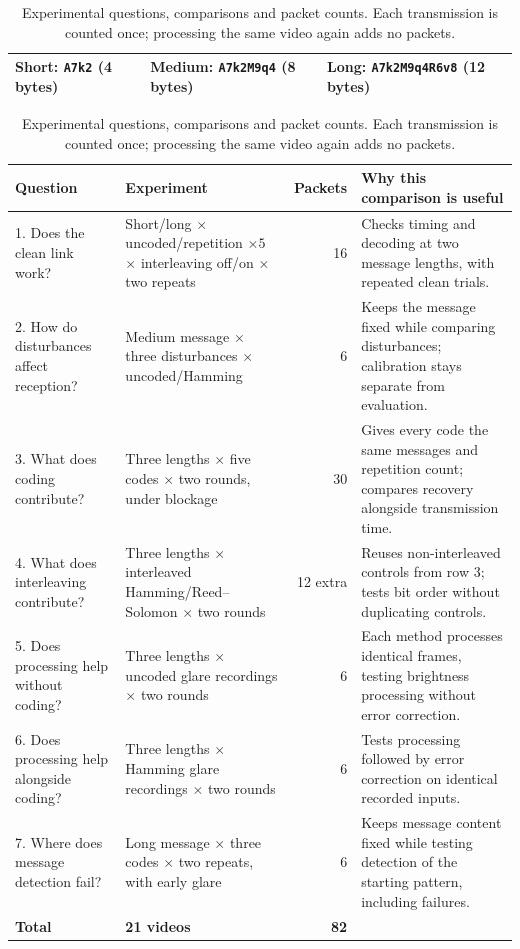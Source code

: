 \documentclass[conference,a4paper]{IEEEtran}
\begin{document}
\begin{table}[t]
\caption{Experimental questions, comparisons and packet counts. Each
transmission is counted once; processing the same video again adds no packets.}
\label{tab:questions}\centering\footnotesize
\begin{tabular}{@{}lll@{}}\toprule
Short: \texttt{A7k2} (4 bytes) & Medium: \texttt{A7k2M9q4} (8 bytes) & Long: \texttt{A7k2M9q4R6v8} (12 bytes)\\\bottomrule
\end{tabular}\par\smallskip
\begin{tabular}{@{}p{}p{}r p{}@{}}\toprule
Question & Experiment & Packets & Why this comparison is useful\\\midrule
1. Does the clean link work? & Short/long $\times$ uncoded/repetition $\times5$ $\times$ interleaving off/on $\times$ two repeats & 16 & Checks timing and decoding at two message lengths, with repeated clean trials.\\[2pt]
2. How do disturbances affect reception? & Medium message $\times$ three disturbances $\times$ uncoded/Hamming & 6 & Keeps the message fixed while comparing disturbances; calibration stays separate from evaluation.\\[2pt]
3. What does coding contribute? & Three lengths $\times$ five codes $\times$ two rounds, under blockage & 30 & Gives every code the same messages and repetition count; compares recovery alongside transmission time.\\[2pt]
4. What does interleaving contribute? & Three lengths $\times$ interleaved Hamming/Reed--Solomon $\times$ two rounds & 12 extra & Reuses non-interleaved controls from row 3; tests bit order without duplicating controls.\\[2pt]
5. Does processing help without coding? & Three lengths $\times$ uncoded glare recordings $\times$ two rounds & 6 & Each method processes identical frames, testing brightness processing without error correction.\\[2pt]
6. Does processing help alongside coding? & Three lengths $\times$ Hamming glare recordings $\times$ two rounds & 6 & Tests processing followed by error correction on identical recorded inputs.\\[2pt]
7. Where does message detection fail? & Long message $\times$ three codes $\times$ two repeats, with early glare & 6 & Keeps message content fixed while testing detection of the starting pattern, including failures.\\\midrule
\textbf{Total} & \textbf{21 videos} & \textbf{82} & \\\bottomrule
\end{tabular}
\end{table}
\end{document}

